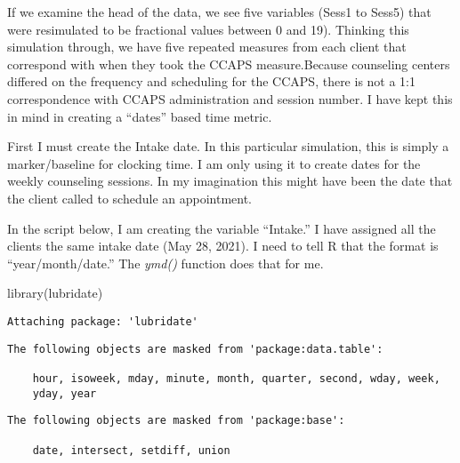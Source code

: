 \documentclass[
  11pt,
]{book}
\newenvironment{Shaded}{\begin{snugshade}}{\end{snugshade}}
\newcommand{\FunctionTok}[1]{\textcolor[rgb]{0.00,0.00,0.00}{#1}}
\newcommand{\NormalTok}[1]{#1}
\newcommand{\OtherTok}[1]{\textcolor[rgb]{0.56,0.35,0.01}{#1}}
\newcommand{\SpecialCharTok}[1]{\textcolor[rgb]{0.00,0.00,0.00}{#1}}
\newcommand{\StringTok}[1]{\textcolor[rgb]{0.31,0.60,0.02}{#1}}
\begin{document}
If we examine the head of the data, we see five variables (Sess1 to Sess5) that were resimulated to be fractional values between 0 and 19). Thinking this simulation through, we have five repeated measures from each client that correspond with when they took the CCAPS measure.Because counseling centers differed on the frequency and scheduling for the CCAPS, there is not a 1:1 correspondence with CCAPS administration and session number. I have kept this in mind in creating a ``dates'' based time metric.

First I must create the Intake date. In this particular simulation, this is simply a marker/baseline for clocking time. I am only using it to create dates for the weekly counseling sessions. In my imagination this might have been the date that the client called to schedule an appointment.

In the script below, I am creating the variable ``Intake.'' I have assigned all the clients the same intake date (May 28, 2021). I need to tell R that the format is ``year/month/date.'' The \emph{ymd()} function does that for me.

\begin{Shaded}
\begin{Highlighting}[]
\FunctionTok{library}\NormalTok{(lubridate)}
\end{Highlighting}
\end{Shaded}

\begin{verbatim}
Attaching package: 'lubridate'
\end{verbatim}

\begin{verbatim}
The following objects are masked from 'package:data.table':

    hour, isoweek, mday, minute, month, quarter, second, wday, week,
    yday, year
\end{verbatim}

\begin{verbatim}
The following objects are masked from 'package:base':

    date, intersect, setdiff, union
\end{verbatim}

\begin{Shaded}
\end{Shaded}
\end{document}
